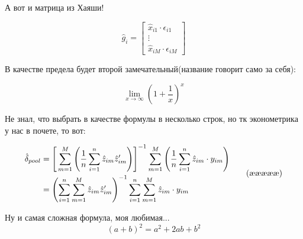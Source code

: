 \documentclass[12pt, a4paper]{article}
\begin{document}
А вот и матрица из Хаяши!

\begin{equation*}
\hat{g}_i =
\begin{bmatrix}
   \hat{x}_{i1} \cdot \epsilon_{i1} \\
   \vdots \\
   \hat{x}_{iM} \cdot \epsilon_{iM}
\end{bmatrix}
\tag{\ae\ae\ae}
\end{equation*}

В качестве предела будет второй замечательный(название говорит само за себя):

\begin{equation}
\lim_{x \to \infty} \left(1+\frac{1}{x}\right)^x	
\tag{\ae\ae\ae\ae}
\end{equation}

Не знал, что выбрать в качестве формулы в несколько строк, но тк эконометрика у нас в почете, то вот:

\begin{equation}
	\begin{aligned}
		\hat{\delta}_{pool} &= \left[\, \sum_{m=1}^M \left( \frac{1}{n} \sum_{i=1}^n
   \hat{z}_{im} \hat{z}_{im}' \right) \right]^{-1} \sum_{m=1}^M 
   \left( \frac{1}{n} \sum_{i=1}^n \hat{z}_{im}\cdot y_{im} \right)
\notag \\
&= \left( \sum_{i=1}^n \sum_{m=1}^M \hat{z}_{im} \hat{z}_{im}' \right)^{-1}
   \sum_{i=1}^n \sum_{m=1}^M \hat{z}_{im} \cdot y_{im}
	\end{aligned}
\tag{\ae\ae\ae\ae\ae}
\end{equation}

Ну и самая сложная формула, моя любимая...
\begin{equation}
	(a+b)^2=a^2+2ab+b^2
\tag{\ae\ae\ae\ae\ae\ae}
\end{equation}
\end{document}
